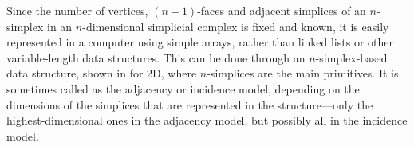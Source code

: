 Since the number of vertices, $(n-1)$-faces and adjacent simplices of an $n$-simplex in an $n$-dimensional simplicial complex is fixed and known, it is easily represented in a computer using simple arrays, rather than linked lists or other variable-length data structures.
This can be done through an $n$-simplex-based data structure, shown in  for 2D, where $n$-simplices are the main primitives.
It is sometimes called as the adjacency or incidence model, depending on the dimensions of the simplices that are represented in the structure---only the highest-dimensional ones in the adjacency model, but possibly all in the incidence model.
\begin{figure}[tbp]
\centering
{}
\quad
{}

\end{figure}
